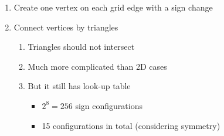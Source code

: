 \begin{enumerate}
    \item Create one vertex on each grid edge with a sign change
    \item Connect vertices by triangles
    \begin{enumerate}
        \item Triangles should not intersect
        \item Much more complicated than 2D cases
        \item But it still has look-up table
        \begin{itemize}
            \item $2^8=256$ sign configurations
            \item 15 configurations in total (considering symmetry)
        \end{itemize}
    \end{enumerate}
\end{enumerate}